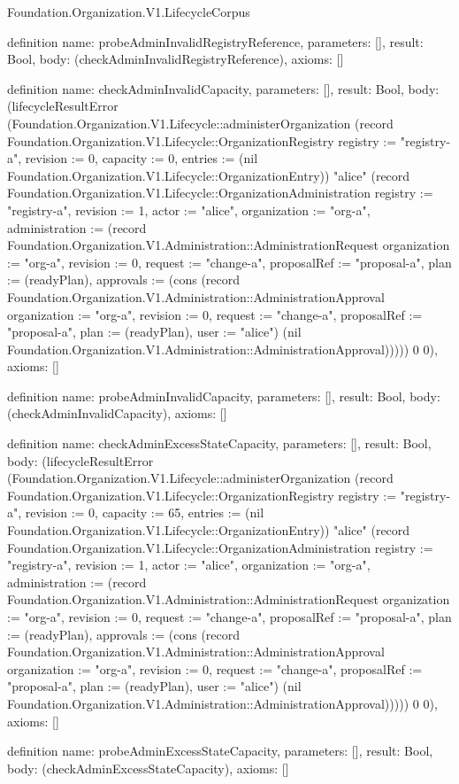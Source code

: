 \begin{lexlean}{Foundation.Organization.V1.LifecycleCorpus}
\begin{semanticmodule}
definition{
  name: probeAdminInvalidRegistryReference,
  parameters: [],
  result: Bool,
  body: (checkAdminInvalidRegistryReference),
  axioms: []
}

definition{
  name: checkAdminInvalidCapacity,
  parameters: [],
  result: Bool,
  body: (lifecycleResultError (Foundation.Organization.V1.Lifecycle::administerOrganization (record Foundation.Organization.V1.Lifecycle::OrganizationRegistry {registry := "registry-a", revision := 0, capacity := 0, entries := (nil Foundation.Organization.V1.Lifecycle::OrganizationEntry)}) "alice" (record Foundation.Organization.V1.Lifecycle::OrganizationAdministration {registry := "registry-a", revision := 1, actor := "alice", organization := "org-a", administration := (record Foundation.Organization.V1.Administration::AdministrationRequest {organization := "org-a", revision := 0, request := "change-a", proposalRef := "proposal-a", plan := (readyPlan), approvals := (cons (record Foundation.Organization.V1.Administration::AdministrationApproval {organization := "org-a", revision := 0, request := "change-a", proposalRef := "proposal-a", plan := (readyPlan), user := "alice"}) (nil Foundation.Organization.V1.Administration::AdministrationApproval))})})) 0 0),
  axioms: []
}

definition{
  name: probeAdminInvalidCapacity,
  parameters: [],
  result: Bool,
  body: (checkAdminInvalidCapacity),
  axioms: []
}

definition{
  name: checkAdminExcessStateCapacity,
  parameters: [],
  result: Bool,
  body: (lifecycleResultError (Foundation.Organization.V1.Lifecycle::administerOrganization (record Foundation.Organization.V1.Lifecycle::OrganizationRegistry {registry := "registry-a", revision := 0, capacity := 65, entries := (nil Foundation.Organization.V1.Lifecycle::OrganizationEntry)}) "alice" (record Foundation.Organization.V1.Lifecycle::OrganizationAdministration {registry := "registry-a", revision := 1, actor := "alice", organization := "org-a", administration := (record Foundation.Organization.V1.Administration::AdministrationRequest {organization := "org-a", revision := 0, request := "change-a", proposalRef := "proposal-a", plan := (readyPlan), approvals := (cons (record Foundation.Organization.V1.Administration::AdministrationApproval {organization := "org-a", revision := 0, request := "change-a", proposalRef := "proposal-a", plan := (readyPlan), user := "alice"}) (nil Foundation.Organization.V1.Administration::AdministrationApproval))})})) 0 0),
  axioms: []
}

definition{
  name: probeAdminExcessStateCapacity,
  parameters: [],
  result: Bool,
  body: (checkAdminExcessStateCapacity),
  axioms: []
}


\end{semanticmodule}
\end{lexlean}
